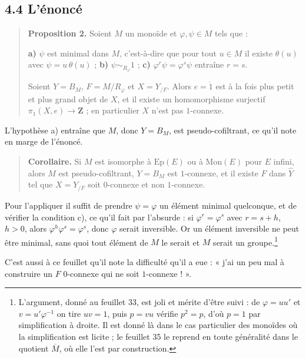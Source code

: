 \documentclass[11pt,a4paper]{article}
\begin{document}
\subsection*{4.4 L'énoncé}

\begin{quote}
\textbf{Proposition 2.} Soient $M$ un monoïde et $\varphi, \psi \in M$ tels
que :

\textbf{a)} $\psi$ est minimal dans $M$, c'est-à-dire que pour tout $u \in M$
il existe $\theta(u)$ avec $\psi = u\,\theta(u)$ ;
\textbf{b)} $\psi \sim_{R_{\varphi}} 1$ ;
\textbf{c)} $\varphi^{r}\psi = \varphi^{s}\psi$ entraîne $r = s$.

Soient $Y = B_{M}$, $F = M/R_{\varphi}$ et $X = Y_{/F}$. Alors $e = \dot{1}$
est à la fois plus petit et plus grand objet de $X$, et il existe un
homomorphisme surjectif $\pi_{1}(X,e) \to \mathbf{Z}$ ; en particulier $X$
n'est pas $1$-connexe.
\end{quote}

L'hypothèse a) entraîne que $M$, donc $Y = B_{M}$, est pseudo-cofiltrant, ce
qu'il note en marge de l'énoncé.

\begin{quote}
\textbf{Corollaire.} Si $M$ est isomorphe à $\mathrm{Ep}(E)$ ou à
$\mathrm{Mon}(E)$ pour $E$ infini, alors $M$ est pseudo-cofiltrant,
$Y = B_{M}$ est $1$-connexe, et il existe $F$ dans $\widehat{Y}$ tel que
$X = Y_{/F}$ soit $0$-connexe et non $1$-connexe.
\end{quote}

Pour l'appliquer il suffit de prendre $\psi = \varphi$ un élément minimal
quelconque, et de vérifier la condition c), ce qu'il fait par l'absurde : si
$\varphi^{r} = \varphi^{s}$ avec $r = s+h$, $h > 0$, alors
$\varphi^{h}\varphi^{s} = \varphi^{s}$, donc $\varphi$ serait inversible. Or un
élément inversible ne peut être minimal, sans quoi tout élément de $M$ le
serait et $M$ serait un groupe.\footnote{L'argument, donné au feuillet 33, est
joli et mérite d'être suivi : de $\varphi = uu'$ et $v = u'\varphi^{-1}$ on
tire $uv = 1$, puis $p = vu$ vérifie $p^{2} = p$, d'où $p = 1$ par
simplification à droite. Il est donné là dans le cas particulier des monoïdes
où la simplification est licite ; le feuillet 35 le reprend en toute
généralité dans le quotient $\overline{M}$, où elle l'est par construction.}

C'est aussi à ce feuillet qu'il note la difficulté qu'il a eue :
« j'ai un peu mal à construire un $F$ $0$-connexe qui ne soit $1$-connexe ! ».
\end{document}
